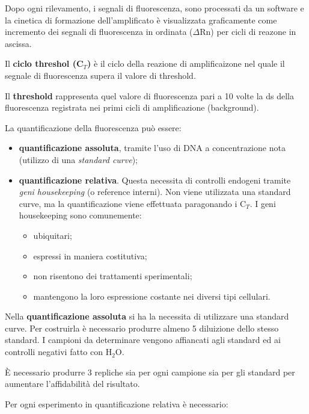 \documentclass[11pt]{book}
\begin{document}
Dopo ogni rilevamento, i segnali di fluorescenza, sono processati da un
software e la cinetica di formazione dell'amplificato è visualizzata
graficamente come incremento dei segnali di fluorescenza in ordinata
(\(\Delta\)Rn) per cicli di reazone in ascissa.

Il \textbf{ciclo threshol (C\(_T\))} è il ciclo della reazione di
amplificaizone nel quale il segnale di fluorescenza supera il valore di
threshold.

Il \textbf{threshold} rappresenta quel valore di fluorescenza pari a 10
volte la ds della fluorescenza registrata nei primi cicli di
amplificazione (background).

La quantificazione della fluorescenza può essere:

\begin{itemize}
\itemsep1pt\parskip0pt
\item
  \textbf{quantificazione assoluta}, tramite l'uso di DNA a
  concentrazione nota (utilizzo di una \emph{standard curve});
\item
  \textbf{quantificazione relativa}. Questa necessita di controlli
  endogeni tramite \emph{geni housekeeping} (o reference interni). Non
  viene utilizzata una standard curve, ma la quantificazione viene
  effettuata paragonando i C\(_T\). I geni housekeeping sono
  comunemente:

  \begin{itemize}
  \itemsep1pt\parskip0pt
  \item
    ubiquitari;
  \item
    espressi in maniera costitutiva;
  \item
    non risentono dei trattamenti sperimentali;
  \item
    mantengono la loro espressione costante nei diversi tipi cellulari.
  \end{itemize}
\end{itemize}

Nella \textbf{quantificazione assoluta} si ha la necessita di utilizzare
una standard curve. Per costruirla è necessario produrre almeno 5
diluizione dello stesso standard. I campioni da determinare vengono
affiancati agli standard ed ai controlli negativi fatto con H\(_2\)O.

È necessario produrre 3 repliche sia per ogni campione sia per gli
standard per aumentare l'affidabilità del risultato.

Per ogni esperimento in quantificazione relativa è necessario:
\end{document}

